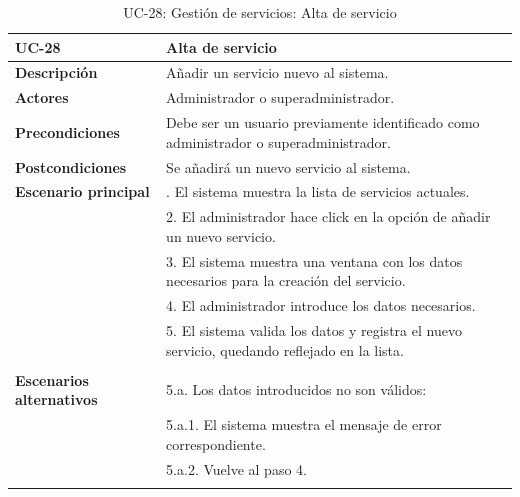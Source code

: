 \begin{table}
  \begin{center}
    \begin{tabularx}{16.4cm}{|l|X|}
      \hline
      \textbf{UC-28} & \textbf{Alta de servicio}\\
      \hline
      \textbf{Descripción} & Añadir un servicio nuevo al sistema.\\
      \hline
      \textbf{Actores} & Administrador o superadministrador.\\
      \hline
      \textbf{Precondiciones} & Debe ser un usuario previamente identificado como administrador o superadministrador.\\
      \hline
      \textbf{Postcondiciones} & Se añadirá un nuevo servicio al sistema.\\
      \hline
      \textbf{Escenario principal} & \smallskip 1. El sistema muestra la lista de servicios actuales.\\
      & 2. El administrador hace click en la opción de añadir un nuevo servicio.\\
      & 3. El sistema muestra una ventana con los datos necesarios para la creación del servicio.\\
      & 4. El administrador introduce los datos necesarios.\\
      & 5. El sistema valida los datos y registra el nuevo servicio, quedando reflejado en la lista.\\
      & \\
      \hline
      \textbf{Escenarios alternativos} & \smallskip 5.a. Los datos introducidos no son válidos:\\
      & \hspace{0.3cm} 5.a.1. El sistema muestra el mensaje de error correspondiente.\\
      & \hspace{0.3cm} 5.a.2. Vuelve al paso 4.\\
      & \\
      \hline
    \end{tabularx}
    \caption{UC-28: Gestión de servicios: Alta de servicio}
    \label{tab:CU-alta-servicio}
  \end{center}
\end{table}


